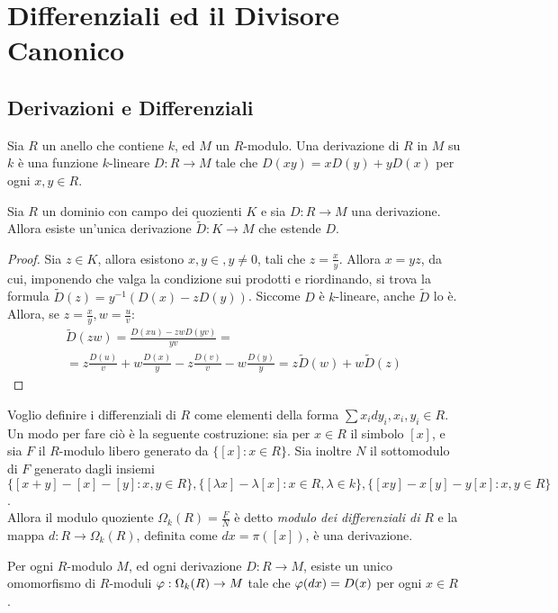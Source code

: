 \chapter{Differenziali ed il Divisore Canonico}
    \section{Derivazioni e Differenziali}
        Sia $R$ un anello che contiene $k$, ed $M$ un $R$-modulo. Una 
        derivazione di $R$ in $M$ su $k$ è una funzione $k$-lineare $D : R \to 
        M$ tale che $D(xy) = xD(y) + yD(x)$ per ogni $x,y \in R$.
        \begin{lemma}\label{lem:der}
            Sia $R$ un dominio con campo dei quozienti $K$ e sia $D : R \to M$ 
            una derivazione. Allora esiste un'unica derivazione $\tilde{D} : K 
            \to M$ che estende $D$.
        \end{lemma}
        \begin{proof}
            Sia $z \in K$, allora esistono $x,y \in, y \neq 0$, tali che $z = 
            \frac{x}{y}$. Allora $x = yz$, da cui, imponendo che valga la 
            condizione sui prodotti e riordinando, si trova la formula 
            $\tilde{D}(z) = y^{-1}(D(x) - zD(y))$. Siccome $D$ è $k$-lineare, 
            anche $\tilde{D}$ lo è. Allora, se $z = \frac{x}{y}, w = \frac{u}{v}$: \begin{multline*}
                \tilde{D}(zw) = \frac{D(xu) - zwD(yv)}{yv} = \\ = z\frac{D(u)}{v} + w \frac{D(x)}{y} - z \frac{D(v)}{v} - w \frac{D(y)}{y} = z \tilde{D}(w) + w \tilde{D}(z)
            \end{multline*}
        \end{proof}
        Voglio definire i differenziali di $R$ come elementi della forma 
        $\sum x_i dy_i, x_i,y_i \in R$. Un modo per fare ciò è la seguente 
        costruzione: sia per $x \in R$ il simbolo $[x]$, e sia $F$ il 
        $R$-modulo libero generato da $\{[x] : x \in R\}$. Sia inoltre $N$ il 
        sottomodulo di $F$ generato dagli insiemi $\{[x+y]-[x]-[y]: x,y \in 
        R\}, \{[\lambda x]- \lambda [x] : x \in R, \lambda \in k\}, 
        \{[xy]-x[y]-y[x] : x,y \in R\}$. \\
        Allora il modulo quoziente $\Omega_k(R) = \frac{F}{N}$ è detto 
        \emph{modulo dei differenziali di }$R$ e la mappa $d : R \to 
        \Omega_k(R)$, definita come $dx = \pi([x])$, è una derivazione.
        \begin{lemma}
            Per ogni $R$-modulo $M$, ed ogni derivazione $D : R \to M$, esiste 
            un unico omomorfismo di $R$-moduli $\varphi : \Omega_k(R) \to M$ tale 
            che $\varphi(dx) = D(x)$ per ogni $x \in R$.
        \end{lemma}
